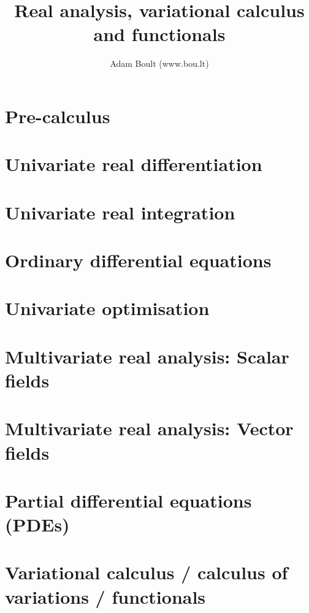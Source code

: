 \documentclass[oneside]{book}
\begin{document}
\author{Adam Boult (www.bou.lt)}
\title{Real analysis, variational calculus and functionals}
\maketitle

\setcounter{tocdepth}{0}
\tableofcontents



\part{Pre-calculus}






\part{Univariate real differentiation}







\part{Univariate real integration}









\part{Ordinary differential equations}



\part{Univariate optimisation}


\part{Multivariate real analysis: Scalar fields}








\part{Multivariate real analysis: Vector fields}



\part{Partial differential equations (PDEs)}


\part{Variational calculus / calculus of variations / functionals}

\end{document}
